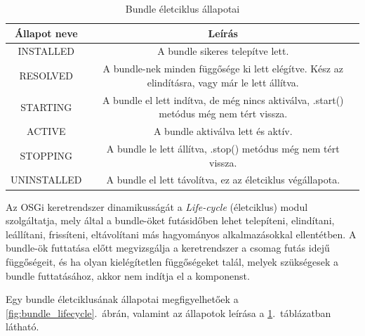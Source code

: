 \begin{table}[htb]
\begin{center}
\begin{tabular}{|c|c|}
\hline
\textbf{Állapot neve} & \textbf{Leírás} \\
\hline
\hline
INSTALLED   & A bundle sikeres telepítve lett. \\
\hline
RESOLVED    & A bundle-nek minden függősége ki lett elégítve. Kész az elindításra, vagy már le lett állítva. \\
\hline
STARTING    & A bundle el lett indítva, de még nincs aktiválva, .start() metódus még nem tért vissza. \\
\hline
ACTIVE      & A bundle aktiválva lett és aktív. \\
\hline
STOPPING    & A bundle le lett állítva, .stop() metódus még nem tért vissza. \\
\hline
UNINSTALLED & A bundle el lett távolítva, ez az életciklus végállapota. \\
\hline
\end{tabular}
\end{center}
\caption{\label{tab:lifecycle_states} Bundle életciklus állapotai}
\end{table}

Az OSGi keretrendszer dinamikusságát a \textit{Life-cycle} (életciklus) modul szolgáltatja, mely által a bundle-öket futásidőben lehet telepíteni, elindítani, leállítani, frissíteni, eltávolítani más hagyományos alkalmazásokkal ellentétben. A bundle-ök futtatása előtt megvizsgálja a keretrendszer a csomag futás idejű függőségeit, és ha olyan kielégítetlen függőségeket talál, melyek szükségesek a bundle futtatásához, akkor nem indítja el a komponenst.

Egy bundle életciklusának állapotai megfigyelhetőek a \ref{fig:bundle_lifecycle}.~ábrán, valamint az állapotok leírása a \ref{tab:lifecycle_states}.~táblázatban látható.


